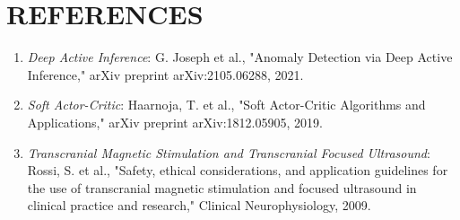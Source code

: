 \documentclass{article}
\begin{document}
\section*{REFERENCES}
\begin{enumerate}
    \item \textit{Deep Active Inference}: G. Joseph et al., "Anomaly Detection via Deep Active Inference," arXiv preprint arXiv:2105.06288, 2021.
    \item \textit{Soft Actor-Critic}: Haarnoja, T. et al., "Soft Actor-Critic Algorithms and Applications," arXiv preprint arXiv:1812.05905, 2019.
    \item \textit{Transcranial Magnetic Stimulation and Transcranial Focused Ultrasound}: Rossi, S. et al., "Safety, ethical considerations, and application guidelines for the use of transcranial magnetic stimulation and focused ultrasound in clinical practice and research," Clinical Neurophysiology, 2009.
\end{enumerate}
\end{document}
